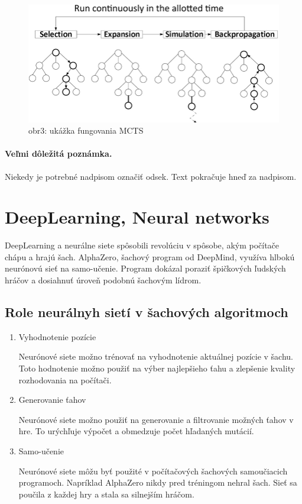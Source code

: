 \documentclass[10pt,twoside,slovak,a4paper]{article}
\begin{document}
\begin{figure}[h]
    \centering
    \includegraphics[width=\textwidth]{MCTS}
    \caption{obr3: ukážka fungovania MCTS}
    \label{obr3}
\end{figure}
\paragraph{Veľmi dôležitá poznámka.}
Niekedy je potrebné nadpisom označiť odsek. Text pokračuje hneď za nadpisom.



\section{DeepLearning, Neural networks} \label{DeepNeural}

DeepLearning a neurálne siete spôsobili revolúciu v spôsobe, akým počítače chápu a hrajú šach. AlphaZero, šachový program od DeepMind, využíva hlbokú neurónovú sieť na samo-učenie. Program dokázal poraziť špičkových ľudských hráčov a dosiahnuť úroveň podobnú šachovým lídrom.
\subsection{Role neurálnyh sietí v šachových algoritmoch} \label{RoleAI}
\begin{enumerate}
	\item Vyhodnotenie pozície

Neurónové siete možno trénovať na vyhodnotenie aktuálnej pozície v šachu. Toto hodnotenie možno použiť na výber najlepšieho ťahu a zlepšenie kvality rozhodovania na počítači.
	\item Generovanie ťahov

Neurónové siete možno použiť na generovanie a filtrovanie možných ťahov v hre. To urýchľuje výpočet a obmedzuje počet hľadaných mutácií.
	\item Samo-učenie

Neurónové siete môžu byť použité v počítačových šachových samoučiacich programoch. Napríklad AlphaZero nikdy pred tréningom nehral šach. Sieť sa poučila z každej hry a stala sa silnejším hráčom.

\end{enumerate}
\end{document}

